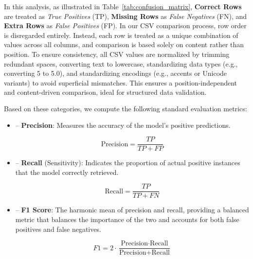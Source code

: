 \documentclass{DESSThesis}
\begin{document}
In this analysis, as illustrated in Table~\ref{tab:confusion_matrix}, \textbf{Correct Rows} are treated as \emph{True Positives} (TP), \textbf{Missing Rows} as \emph{False Negatives} (FN), and \textbf{Extra Rows} as \emph{False Positives} (FP). In our CSV comparison process, row order is disregarded entirely. Instead, each row is treated as a unique combination of values across all columns, and comparison is based solely on content rather than position. To ensure consistency, all CSV values are normalized by trimming redundant spaces, converting text to lowercase,  standardizing data types (e.g., converting 5 to 5.0), and standardizing encodings (e.g., accents or Unicode variants) to avoid superficial mismatches. This ensures a position-independent and content-driven comparison, ideal for structured data validation.

Based on these categories, we compute the following standard evaluation metrics:

\begin{itemize}
    \item[] – \textbf{Precision}: Measures the accuracy of the model's positive predictions.

    \begin{equation}
        \text{Precision} = \frac{TP}{TP + FP}
    \end{equation}
    
    \item[] – \textbf{Recall} (Sensitivity): Indicates the proportion of actual positive instances that the model correctly retrieved.

    \begin{equation}
        \text{Recall} = \frac{TP}{TP + FN}
    \end{equation}
    
    \item[] – \textbf{F1 Score}: The harmonic mean of precision and recall, providing a balanced metric that balances the importance of the two and accounts for both false positives and false negatives. 

    \begin{equation}
        F1 = 2 \cdot \frac{\text{Precision} \cdot \text{Recall}}{\text{Precision} + \text{Recall}}
    \end{equation}
    
\end{itemize}
\end{document}
